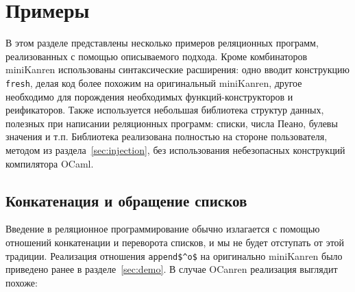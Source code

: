 
\section{Примеры}
\label{sec:examples}

В этом разделе представлены несколько примеров реляционных программ, реализованных с помощью описываемого подхода.
Кроме комбинаторов miniKanren использованы синтаксические расширения: одно вводит конструкцию \lstinline|fresh|, делая код более похожим на оригинальный miniKanren,
другое необходимо для порождения необходимых функций-конструкторов и реификаторов.
Также используется небольшая библиотека структур данных, полезных при написании реляционных программ: списки, числа Пеано, булевы значения и т.п.
Библиотека реализована полностью на стороне пользователя, методом из раздела~\ref{sec:injection}, без использования небезопасных конструкций компилятора OCaml.



\subsection{Конкатенация и обращение списков}

Введение в реляционное программирование обычно излагается с помощью отношений конкатенации и переворота списков, и мы не будет отступать от этой традиции.
Реализация отношения  \lstinline|append$^o$| на оригинально miniKanren было приведено ранее в разделе~\ref{sec:demo}.
В случае OCanren реализация выглядит похоже:


